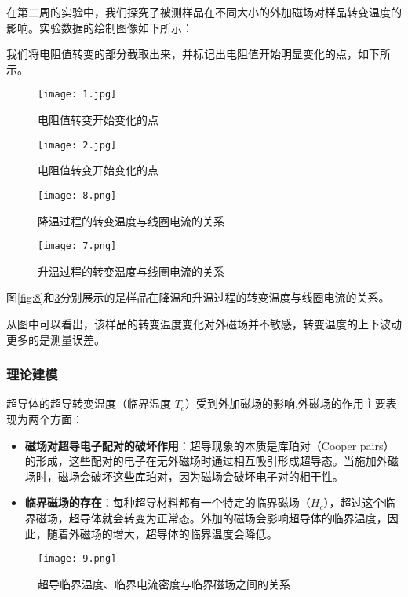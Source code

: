 在第二周的实验中，我们探究了被测样品在不同大小的外加磁场对样品转变温度的影响。实验数据的绘制图像如下所示：



我们将电阻值转变的部分截取出来，并标记出电阻值开始明显变化的点，如下所示。

\begin{figure}[H]
	\centering
	\texttt{[image: 1.jpg]}
	\caption{电阻值转变开始变化的点}
	\label{fig:1}
\end{figure}

\begin{figure}[H]
	\centering
	\texttt{[image: 2.jpg]}
	\caption{电阻值转变开始变化的点}
	\label{fig:2}
\end{figure}

\begin{figure}[H]
	\centering
	\begin{minipage}{0.4\linewidth}
		\centering
		\texttt{[image: 8.png]}
		\caption{降温过程的转变温度与线圈电流的关系}
		\label{fig:8}
	\end{minipage}
	\hspace{0.04\linewidth}
	\begin{minipage}{0.4\linewidth}
		\centering
		\texttt{[image: 7.png]}
		\caption{升温过程的转变温度与线圈电流的关系}
		\label{fig:7}
	\end{minipage}
\end{figure}


图\ref{fig:8}和\ref{fig:7}分别展示的是样品在降温和升温过程的转变温度与线圈电流的关系。

从图中可以看出，该样品的转变温度变化对外磁场并不敏感，转变温度的上下波动更多的是测量误差。
\subsubsection{理论建模}

超导体的超导转变温度（临界温度 $T_c$）受到外加磁场的影响,外磁场的作用主要表现为两个方面：
\begin{itemize}
    \item \textbf{磁场对超导电子配对的破坏作用}：超导现象的本质是库珀对（Cooper pairs）的形成，这些配对的电子在无外磁场时通过相互吸引形成超导态。当施加外磁场时，磁场会破坏这些库珀对，因为磁场会破坏电子对的相干性。
    \item \textbf{临界磁场的存在}：每种超导材料都有一个特定的临界磁场（$H_{c}$），超过这个临界磁场，超导体就会转变为正常态。外加的磁场会影响超导体的临界温度，因此，随着外磁场的增大，超导体的临界温度会降低。
\end{itemize}
\begin{figure}[{H}]
	\centering
	\texttt{[image: 9.png]}
	\caption{超导临界温度、临界电流密度与临界磁场之间的关系}
	\label{}
\end{figure}

